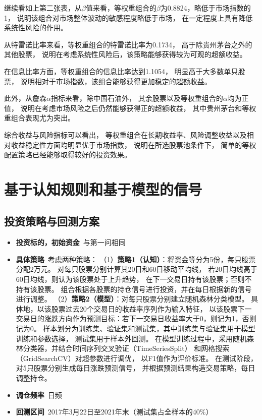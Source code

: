 \documentclass[a4paper,12pt]{article}
\begin{document}
继续看如上第二张表，从$\beta$值来看，等权重组合的$\beta$为0.8824，略低于市场指数的1，
说明该组合对市场整体波动的敏感程度略低于市场，
在一定程度上具有降低系统性风险的作用。

从特雷诺比率来看，等权重组合的特雷诺比率为0.1734，
高于除贵州茅台之外的其他股票，
说明在考虑系统性风险后，该策略能够获得较为可观的超额收益。

在信息比率方面，等权重组合的信息比率达到1.1054，
明显高于大多数单只股票，
说明相对于市场指数，该组合能够获得更加稳定的超额收益。

此外，从詹森$\alpha$指标来看，除中国石油外，
其余股票以及等权重组合的$\alpha$均为正值，
说明在考虑市场风险之后仍然能够获得正的超额收益，
其中贵州茅台和等权重组合表现尤为突出。

综合收益与风险指标可以看出，
等权重组合在长期收益率、风险调整收益以及相对收益稳定性方面均明显优于市场指数，
说明在所选股票池条件下，
简单的等权配置策略已经能够取得较好的投资效果。


\section{基于认知规则和基于模型的信号}

\subsection{投资策略与回测方案}

\begin{itemize}
\item \textbf{投资标的，初始资金}\ 与第一问相同
\item \textbf{具体策略}\ 考虑两种策略：
（1）\textbf{策略1（认知）}：将资金等分为5份，每只股票分配2万元。
对每只股票分别计算其20日和60日移动平均线，
若20日均线高于60日均线，则认为该股票处于上升趋势，
在下一交易日持有该股票；否则不持有该股票。
组合根据各股票的持仓信号进行投资，并在每日根据新的信号进行调整。
（2）\textbf{策略2（模型）}：对每只股票分别建立随机森林分类模型。
具体地，以该股票过去20个交易日的收益率序列作为输入特征，
以该股票下一交易日的涨跌方向作为预测目标：若下一交易日收益率大于0，则记为1，否则记为0。
样本划分为训练集、验证集和测试集，其中训练集与验证集用于模型训练和参数选择，
测试集用于样本外回测。
在模型训练过程中，采用随机森林分类器，并结合时间序列交叉验证（TimeSeriesSplit）
和网格搜索（GridSearchCV）对超参数进行调优，
以F1值作为评价标准。
在测试阶段，对5只股票分别生成每日涨跌预测信号，
并根据预测结果构造交易策略，每日调整持仓。
\item \textbf{调仓频率}\ 日频
\item \textbf{回测区间}\ 2017年3月22日至2021年末（测试集占全样本的40\%）
\end{itemize}
\end{document}
